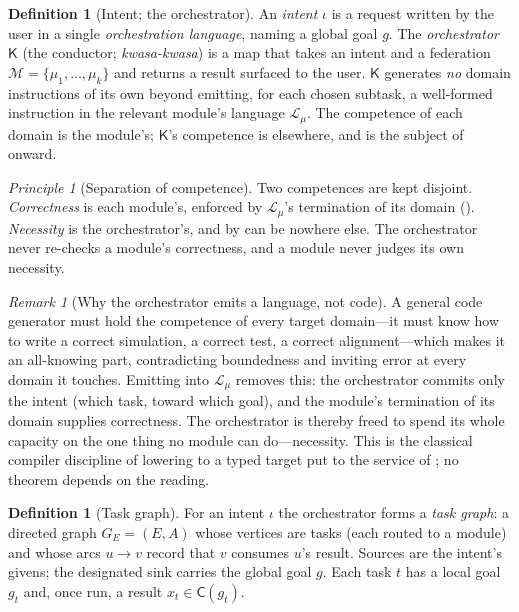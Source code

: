 \documentclass[twocolumn,11pt,a4paper]{article}
\theoremstyle{sup}
\theoremstyle{definition}
\newtheorem{definition}[theorem]{Definition}
\theoremstyle{remark}
\newtheorem{remark}[theorem]{Remark}
\newtheorem{principle}[theorem]{Principle}
\newcommand{\cell}{\mathsf{C}}        %
\newcommand{\task}{t}
\newcommand{\Ens}{E}                  %
\newcommand{\intent}{\iota}           %
\newcommand{\mods}{\mathcal{M}}       %
\newcommand{\modu}{\mu}               %
\newcommand{\dsl}{\mathcal{L}}        %
\newcommand{\orch}{\mathsf{K}}        %
\newcommand{\set}[1]{\{#1\}}
\begin{document}
\begin{definition}[Intent; the orchestrator]
\label{def:orchestrator}
An \emph{intent} $\intent$ is a request written by the user in a single
\emph{orchestration language}, naming a global goal $g$. The \emph{orchestrator}
$\orch$ (the conductor; \emph{kwasa-kwasa}) is a map that takes an intent and a
federation $\mods=\set{\modu_1,\dots,\modu_k}$ and returns a result surfaced to
the user. $\orch$ generates \emph{no} domain instructions of its own beyond
emitting, for each chosen subtask, a well-formed instruction in the relevant
module's language $\dsl_\modu$. The competence of each domain is the module's;
$\orch$'s competence is elsewhere, and is the subject of 
onward.
\end{definition}

\begin{principle}[Separation of competence]
\label{prin:separation}
Two competences are kept disjoint. \emph{Correctness} is each module's, enforced
by $\dsl_\modu$'s termination of its domain (). \emph{Necessity}
is the orchestrator's, and by  can be nowhere else. The
orchestrator never re-checks a module's correctness, and a module never judges its
own necessity.
\end{principle}

\begin{remark}[Why the orchestrator emits a language, not code]
\label{rem:emit-dsl}
A general code generator must hold the competence of every target domain---it must
know how to write a correct simulation, a correct test, a correct alignment---which
makes it an all-knowing part, contradicting boundedness and inviting error at
every domain it touches. Emitting into $\dsl_\modu$ removes this: the orchestrator
commits only the intent (which task, toward which goal), and the module's
termination of its domain supplies correctness. The orchestrator is thereby freed
to spend its whole capacity on the one thing no module can do---necessity.
This is the classical compiler discipline of lowering to a typed target
\citep{aho2006,mernik2005} put to the service of ; no
theorem depends on the reading.
\end{remark}

\begin{definition}[Task graph]
\label{def:taskgraph}
For an intent $\intent$ the orchestrator forms a \emph{task graph}: a directed
graph $G_\Ens=(\Ens,A)$ whose vertices are tasks (each routed to a module) and
whose arcs $u\to v$ record that $v$ consumes $u$'s result. Sources are the
intent's givens; the designated sink carries the global goal $g$. Each task $\task$
has a local goal $g_\task$ and, once run, a result $x_\task\in\cell(g_\task)$.
\end{definition}
\end{document}
